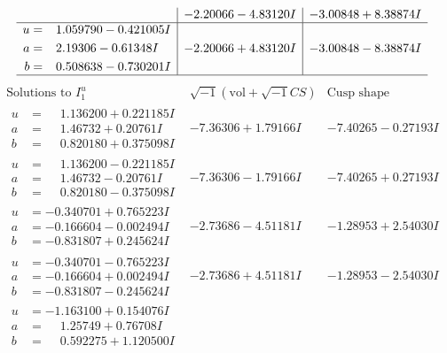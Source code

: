 \documentclass[1p]{elsarticle_modified}
\theoremstyle{definition}
\newcommand{\I}{\sqrt{-1}}
\begin{document}
$$\begin{array}{c|c|c}
 & -2.20066 - 4.83120 I & -3.00848 + 8.38874 I \\ \hline\begin{aligned}
u &= \phantom{-}1.059790 - 0.421005 I \\
a &= \phantom{-}2.19306 - 0.61348 I \\
b &= \phantom{-}0.508638 - 0.730201 I\end{aligned}
 & -2.20066 + 4.83120 I & -3.00848 - 8.38874 I\\
 \hline 
 \end{array}$$\newpage$$\begin{array}{c|c|c}  
\text{Solutions to }I^u_{1}& \I (\text{vol} + \sqrt{-1}CS) & \text{Cusp shape}\\
 \hline 
\begin{aligned}
u &= \phantom{-}1.136200 + 0.221185 I \\
a &= \phantom{-}1.46732 + 0.20761 I \\
b &= \phantom{-}0.820180 + 0.375098 I\end{aligned}
 & -7.36306 + 1.79166 I & -7.40265 - 0.27193 I \\ \hline\begin{aligned}
u &= \phantom{-}1.136200 - 0.221185 I \\
a &= \phantom{-}1.46732 - 0.20761 I \\
b &= \phantom{-}0.820180 - 0.375098 I\end{aligned}
 & -7.36306 - 1.79166 I & -7.40265 + 0.27193 I \\ \hline\begin{aligned}
u &= -0.340701 + 0.765223 I \\
a &= -0.166604 - 0.002494 I \\
b &= -0.831807 + 0.245624 I\end{aligned}
 & -2.73686 - 4.51181 I & -1.28953 + 2.54030 I \\ \hline\begin{aligned}
u &= -0.340701 - 0.765223 I \\
a &= -0.166604 + 0.002494 I \\
b &= -0.831807 - 0.245624 I\end{aligned}
 & -2.73686 + 4.51181 I & -1.28953 - 2.54030 I \\ \hline\begin{aligned}
u &= -1.163100 + 0.154076 I \\
a &= \phantom{-}1.25749 + 0.76708 I \\
b &= \phantom{-}0.592275 + 1.120500 I\end{aligned}

\end{array}$$
\end{document}
